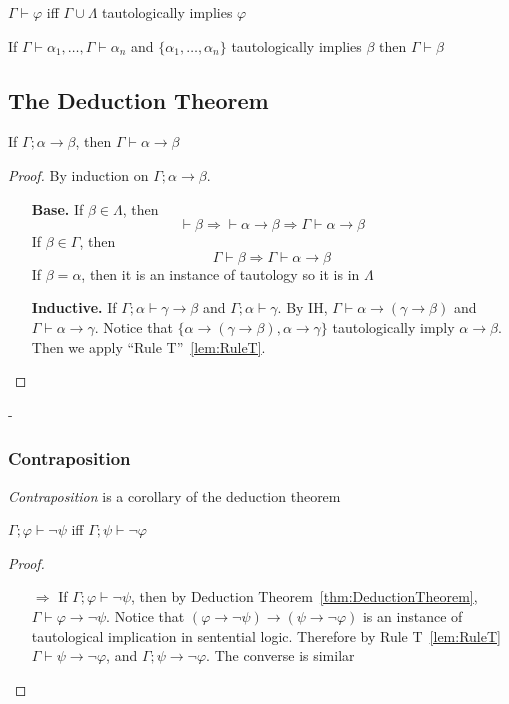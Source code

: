 \begin{lemma}
    $\Gamma\vdash\varphi$ iff $\Gamma\cup\Lambda$ tautologically implies $\varphi$
\end{lemma}

\begin{lemma}
    \label{lem:RuleT}
    If $\Gamma\vdash\alpha_1,\dots,\Gamma\vdash\alpha_n$ and $\{\alpha_1,\dots,\alpha_n\}$ tautologically implies $\beta$ then $\Gamma\vdash\beta$
\end{lemma}

\subsection{The Deduction Theorem}

\begin{theorem}
    \label{thm:DeductionTheorem}
    If $\Gamma;\alpha\to\beta$, then $\Gamma\vdash\alpha\to\beta$
\end{theorem}
\begin{proof}
    By induction on $\Gamma;\alpha\to\beta$.
    \begin{itemize}
        \item[] \textbf{Base.} If $\beta\in\Lambda$, then
        \[ \vdash\beta \Rightarrow \vdash \alpha\to\beta \Rightarrow \Gamma\vdash\alpha\to\beta \]
        If $\beta\in\Gamma$, then
        \[ \Gamma\vdash\beta \Rightarrow \Gamma\vdash\alpha\to\beta \]
        If $\beta=\alpha$, then it is an instance of tautology so it is in $\Lambda$
        \item[] \textbf{Inductive.} If $\Gamma;\alpha\vdash\gamma\to\beta$ and $\Gamma;\alpha\vdash\gamma$. By IH, $\Gamma\vdash\alpha\to(\gamma\to\beta)$ and $\Gamma\vdash\alpha\to\gamma$. Notice that $\{ \alpha\to(\gamma\to\beta), \alpha\to\gamma \}$ tautologically imply $\alpha\to\beta$. Then we apply ``Rule T''~\ref{lem:RuleT}.
    \end{itemize}
\end{proof}
-
\subsubsection{Contraposition}

\emph{Contraposition} is a corollary of the deduction theorem

\begin{theorem}[Contraposition]
    $\Gamma;\varphi\vdash\neg\psi$ iff $\Gamma;\psi\vdash\neg\varphi$
\end{theorem}
\begin{proof}
    \begin{itemize}
        \item[$\Rightarrow$] If $\Gamma;\varphi\vdash\neg\psi$, then by Deduction Theorem~\ref{thm:DeductionTheorem}, $\Gamma\vdash\varphi\to\neg\psi$. Notice that $\left( \varphi\to\neg\psi \right) \to \left( \psi\to\neg\varphi \right)$ is an instance of tautological implication in sentential logic. Therefore by Rule T~\ref{lem:RuleT} $\Gamma\vdash\psi\to\neg\varphi$, and $\Gamma;\psi\to\neg\varphi$. The converse is similar
    \end{itemize}
\end{proof}

